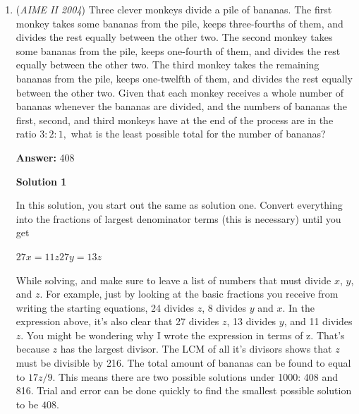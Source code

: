 \begin{enumerate}
Suppose $1000$ workers can complete one quarter of the job in one day. After the first day, there were $900$ workers remaining so the second quarter was completed in $\frac{10}{9}$ days. Now there are only $800$ workers remaining so the third quarter can be completed in $\frac{10}{8}$ days. It has been $1+\frac{10}{9}+\frac{10}{8}=\frac{121}{36}$ days since the job started, and we still have $\frac{23}{36}$ days to complete the last quarter of the job, so we need $\frac{36}{23}$ of $1000$ workers, or $1565.2173913$. Since we can’t hire fractional workers, $1566-800=\boxed{766}$ must be the answer.

 


	\item (\textit{AIME II 2004}) Three clever monkeys divide a pile of bananas. The first monkey takes some bananas from the pile, keeps three-fourths of them, and divides the rest equally between the other two. The second monkey takes some bananas from the pile, keeps one-fourth of them, and divides the rest equally between the other two. The third monkey takes the remaining bananas from the pile, keeps one-twelfth of them, and divides the rest equally between the other two. Given that each monkey receives a whole number of bananas whenever the bananas are divided, and the numbers of bananas the first, second, and third monkeys have at the end of the process are in the ratio $3: 2: 1,$ what is the least possible total for the number of bananas?


 
 \textbf{Answer: }408



\textbf{Solution 1}

In this solution, you start out the same as solution one. Convert everything into the fractions of largest denominator terms (this is necessary) until you get 

 $27x=11z$$27y=13z$

 While solving, and make sure to leave a list of numbers that must divide $x$, $y$, and $z$. For example, just by looking at the basic fractions you receive from writing the starting equations, 24 divides $z$, 8 divides $y$ and $x$. In the expression above, it's also clear that 27 divides $z$, 13 divides $y$, and 11 divides $z$. You might be wondering why I wrote the expression in terms of z. That's because $z$ has the largest divisor. The LCM of all it's divisors shows that $z$ must be divisible by 216. The total amount of bananas can be found to equal to $17z/9$. This means there are two possible solutions under 1000: 408 and 816. Trial and error can be done quickly to find the smallest possible solution to be $\boxed{408}$.


\end{enumerate}
